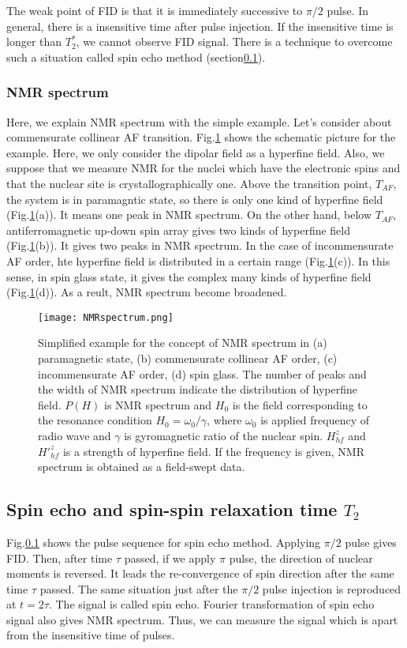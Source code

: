 \documentclass[a4,10.5pt]{report}
\begin{document}
The weak point of FID is that it is immediately successive to $\pi/2$ pulse.
In general, there is a insensitive time after pulse injection.
If the insensitive time is longer than $T^*_2$, we cannot observe FID signal.
There is a technique to overcome such a situation called spin echo method (section\ref{spin_echo}).


\subsubsection{NMR spectrum}
Here, we explain NMR spectrum with the simple example.
Let's consider about commensurate collinear AF transition. 
Fig.\ref{NMRspectrum} shows the schematic picture for the example.
Here, we only consider the dipolar field as a hyperfine field.
Also, we suppose that we measure NMR for the nuclei which have the electronic spins and that the nuclear site is crystallographically one.
Above the transition point, $T_{AF}$, the system is in paramagntic state, so there is only one kind of hyperfine field (Fig.\ref{NMRspectrum}(a)).
It means one peak in NMR spectrum.
On the other hand, below $T_{AF}$, antiferromagnetic up-down spin array gives two kinds of hyperfine field (Fig.\ref{NMRspectrum}(b)). 
It gives two peaks in NMR spectrum.
In the case of incommensurate AF order, hte hyperfine field is distributed in a certain range (Fig.\ref{NMRspectrum}(c)).
In this sense, in spin glass state, it gives the complex many kinds of hyperfine field (Fig.\ref{NMRspectrum}(d)).
As a reult, NMR spectrum become broadened.

\begin{figure}
  \centering
  \texttt{[image: NMRspectrum.png]}
  \caption{Simplified example for the concept of NMR spectrum
  in (a) paramagnetic state, (b) commensurate collinear AF order,  (c) incommensurate AF order, (d) spin glass.
  The number of peaks and the width of NMR spectrum indicate the distribution of hyperfine field.
  $P(H)$ is NMR spectrum and $H_0$ is the field corresponding to the resonance condition $H_0 = \omega_0/\gamma$,
  where $\omega_0$ is applied frequency of radio wave and $\gamma$ is gyromagnetic ratio of the nuclear spin.
  $H^z_{hf}$ and $H'^z_{hf}$ is a strength of hyperfine field.
  If the frequency is given, NMR spectrum is obtained as a field-swept data.}
  \label{NMRspectrum}
\end{figure}


\subsection{Spin echo and spin-spin relaxation time $T_2$}
\label{spin_echo}
Fig.\ref{spin_echo} shows the pulse sequence for spin echo method.
Applying $\pi/2$ pulse gives FID.
Then, after time $\tau$ passed, if we apply $\pi$ pulse, the direction of nuclear moments is reversed.
It leads the re-convergence of spin direction after the same time $\tau$ passed.
The same situation just after the $\pi/2$ pulse injection is reproduced at $t = 2\tau$.
The signal is called spin echo.
Fourier transformation of spin echo signal also gives NMR spectrum.
Thus, we can measure the signal which is apart from the insensitive time of pulses.
\end{document}
